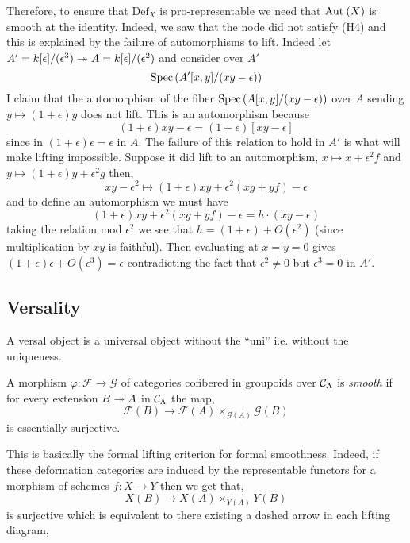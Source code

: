\documentclass[12pt]{article}
\newcommand{\Def}{\mathrm{Def}}
\renewcommand{\F}{\mathcal{F}}
\renewcommand{\G}{\mathcal{G}}
\begin{document}
\begin{rmk}
Therefore, to ensure that $\Def_X$ is pro-representable we need that $\mathrm{Aut}_{} \left( X \right)$ is smooth at the identity. Indeed, we saw that the node did not satisfy (H4) and this is explained by the failure of automorphisms to lift. Indeed let $A' = k[\epsilon]/(\epsilon^3) \twoheadrightarrow A = k[\epsilon]/(\epsilon^2)$ and consider over $A'$
\[ \mathrm{Spec}\left( A'[x,y]/(xy - \epsilon) \right) \]
I claim that the automorphism of the fiber $\mathrm{Spec}\left( A[x,y]/(xy - \epsilon) \right)$ over $A$ sending $y \mapsto (1 + \epsilon) y$ does not lift. This is an automorphism because
\[ (1 + \epsilon) xy - \epsilon = (1 + \epsilon) [xy - \epsilon] \]
since in $(1 + \epsilon) \epsilon = \epsilon$ in $A$. The failure of this relation to hold in $A'$ is what will make lifting impossible. Suppose it did lift to an automorphism, $x \mapsto x + \epsilon^2 f$ and $y \mapsto (1 + \epsilon) y + \epsilon^2 g$ then,
\[ xy - \epsilon^2 \mapsto (1 + \epsilon) xy + \epsilon^2 (x g + y f) - \epsilon \]
and to define an automorphism we must have
\[ (1 + \epsilon) xy + \epsilon^2 (x g + y f) - \epsilon = h \cdot (xy - \epsilon) \]
taking the relation mod $\epsilon^2$ we see that $h = (1 + \epsilon) + O(\epsilon^2)$ (since multiplication by $xy$ is faithful). Then evaluating at $x = y = 0$ gives $(1 + \epsilon) \epsilon + O(\epsilon^3) = \epsilon$ contradicting the fact that $\epsilon^2 \neq 0$ but $\epsilon^3 = 0$ in $A'$.
\end{rmk}


\subsection{Versality}

\begin{rmk}
A versal object is a universal object without the ``uni'' i.e. without the uniqueness. 
\end{rmk}

\begin{defn}
A morphism $\varphi : \F \to \G$ of categories cofibered in groupoids over $\mathcal{C}_\Lambda$ is \textit{smooth} if for every extension $B \twoheadrightarrow A$ in $\mathcal{C}_{\Lambda}$ the map,
\[ \F(B) \to \F(A) \times_{\G(A)} \G(B) \]
is essentially surjective.
\end{defn}

\begin{rmk}
This is basically the formal lifting criterion for formal smoothness. Indeed, if these deformation categories are induced by the representable functors for a morphism of schemes $f : X \to Y$ then we get that,
\[ X(B) \to X(A) \times_{Y(A)} Y(B) \]
is surjective which is equivalent to there existing a dashed arrow in each lifting diagram,
\begin{center}
\end{center} 
\end{rmk}
\end{document}
